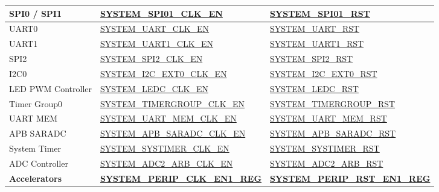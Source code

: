 \documentclass[main\_\_EN.tex]{subfiles}
\begin{document}
\begin{ThreePartTable}
\begin{longtable}[c]{ |l|l|l| }
    SPI0 / SPI1     & \hyperref[fielddesc:SYSTEMSPI01CLKEN]{SYSTEM\_SPI01\_CLK\_EN}         & \hyperref[fielddesc:SYSTEMSPI01RST]{SYSTEM\_SPI01\_RST} \\\hline
    UART0           & \hyperref[fielddesc:SYSTEMUARTCLKEN]{SYSTEM\_UART\_CLK\_EN}          & \hyperref[fielddesc:SYSTEMUARTRST]{SYSTEM\_UART\_RST} \\\hline
    UART1           & \hyperref[fielddesc:SYSTEMUART1CLKEN]{SYSTEM\_UART1\_CLK\_EN}         & \hyperref[fielddesc:SYSTEMUART1RST]{SYSTEM\_UART1\_RST} \\\hline
    SPI2            & \hyperref[fielddesc:SYSTEMSPI2CLKEN]{SYSTEM\_SPI2\_CLK\_EN}          & \hyperref[fielddesc:SYSTEMSPI2RST]{SYSTEM\_SPI2\_RST} \\\hline
    I2C0            & \hyperref[fielddesc:SYSTEMI2CEXT0CLKEN]{SYSTEM\_I2C\_EXT0\_CLK\_EN}          & \hyperref[fielddesc:SYSTEMI2CEXT0RST]{SYSTEM\_I2C\_EXT0\_RST} \\\hline
    LED PWM Controller & \hyperref[fielddesc:SYSTEMLEDCCLKEN]{SYSTEM\_LEDC\_CLK\_EN}          & \hyperref[fielddesc:SYSTEMLEDCRST]{SYSTEM\_LEDC\_RST} \\\hline
    Timer Group0    & \hyperref[fielddesc:SYSTEMTIMERGROUPCLKEN]{SYSTEM\_TIMERGROUP\_CLK\_EN} & \hyperref[fielddesc:SYSTEMTIMERGROUPRST]{SYSTEM\_TIMERGROUP\_RST} \\\hline
    UART MEM    & \hyperref[fielddesc:SYSTEMUARTMEMCLKEN]{SYSTEM\_UART\_MEM\_CLK\_EN} \tnote{4} & \hyperref[fielddesc:SYSTEMUARTMEMRST]{SYSTEM\_UART\_MEM\_RST} \\\hline
    APB SARADC    & \hyperref[fielddesc:SYSTEMAPBSARADCCLKEN]{SYSTEM\_APB\_SARADC\_CLK\_EN} & \hyperref[fielddesc:SYSTEMAPBSARADCRST]{SYSTEM\_APB\_SARADC\_RST} \\\hline
    System Timer    & \hyperref[fielddesc:SYSTEMSYSTIMERCLKEN]{SYSTEM\_SYSTIMER\_CLK\_EN} & \hyperref[fielddesc:SYSTEMSYSTIMERRST]{SYSTEM\_SYSTIMER\_RST} \\\hline
    ADC Controller    & \hyperref[fielddesc:SYSTEMADC2ARBCLKEN]{SYSTEM\_ADC2\_ARB\_CLK\_EN} & \hyperref[fielddesc:SYSTEMADC2ARBRST]{SYSTEM\_ADC2\_ARB\_RST} \\\hline

    \textbf{Accelerators} & \textbf{\hyperref[regdesc:SYSTEMPERIPCLKEN1REG]{SYSTEM\_PERIP\_CLK\_EN1\_REG}} & \textbf{\hyperref[regdesc:SYSTEMPERIPRSTEN1REG]{SYSTEM\_PERIP\_RST\_EN1\_REG}} \\ \hline


\end{longtable}
\end{ThreePartTable}
\end{document}
